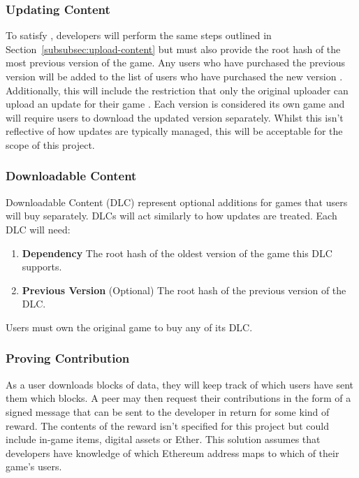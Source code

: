 \subsubsection*{Updating Content}\label{subsubsec:updating}

To satisfy , developers will perform the same steps outlined in Section~\ref{subsubsec:upload-content} but must also provide the root hash of the most previous version of the game. Any users who have purchased the previous version will be added to the list of users who have purchased the new version . Additionally, this will include the restriction that only the original uploader can upload an update for their game .
\x
Each version is considered its own game and will require users to download the updated version separately. Whilst this isn't reflective of how updates are typically managed, this will be acceptable for the scope of this project.

\subsubsection*{Downloadable Content}

Downloadable Content (DLC)  represent optional additions for games that users will buy separately. DLCs will act similarly to how updates are treated. Each DLC will need:

\begin{enumerate}
  \item \textbf{Dependency} The root hash of the oldest version of the game this DLC supports.
  \item \textbf{Previous Version} (Optional) The root hash of the previous version of the DLC.
\end{enumerate}

\vspace{2mm}\noindent
Users must own the original game to buy any of its DLC. 

\subsubsection*{Proving Contribution}

As a user downloads blocks of data, they will keep track of which users have sent them which blocks. A peer may then request their contributions in the form of a signed message that can be sent to the developer  in return for some kind of reward. The contents of the reward isn't specified for this project but could include in-game items, digital assets or Ether. This solution assumes that developers have knowledge of which Ethereum address maps to which of their game's users.
